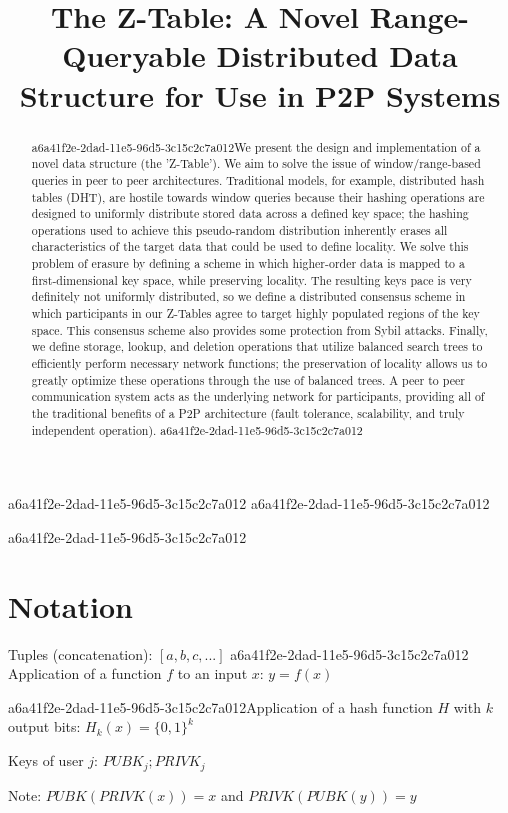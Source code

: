 \documentclass[12pt]{article}
\title{The Z-Table: A Novel Range-Queryable Distributed Data Structure for Use in P2P Systems}
\begin{document}
\maketitle
a6a41f2e-2dad-11e5-96d5-3c15c2c7a012
a6a41f2e-2dad-11e5-96d5-3c15c2c7a012\begin{abstract}
a6a41f2e-2dad-11e5-96d5-3c15c2c7a012We present the design and implementation of a novel data structure (the 'Z-Table'). We aim to solve the issue of window/range-based queries in peer to peer architectures. Traditional models, for example,  distributed hash tables (DHT), are hostile towards window queries because their hashing operations are designed to uniformly distribute stored data across a defined key space; the hashing operations used to achieve this pseudo-random distribution inherently erases all characteristics of the target data that could be used to define locality. We solve this problem of erasure by defining a scheme in which higher-order data is mapped to a first-dimensional key space, while preserving locality. The resulting keys pace is very definitely not uniformly distributed, so we define a distributed consensus scheme in which participants in our Z-Tables agree to target highly populated regions of the key space. This consensus scheme also provides some protection from Sybil attacks. Finally, we define storage, lookup, and deletion operations that utilize balanced search trees to efficiently perform necessary network functions; the preservation of locality allows us to greatly optimize these operations through the use of balanced trees. A peer to peer communication system acts as the underlying network for participants, providing all of the traditional benefits of a P2P architecture (fault tolerance, scalability, and truly independent operation).
a6a41f2e-2dad-11e5-96d5-3c15c2c7a012\end{abstract}

a6a41f2e-2dad-11e5-96d5-3c15c2c7a012\section{Notation}

Tuples (concatenation): $[a,b,c,...]$
a6a41f2e-2dad-11e5-96d5-3c15c2c7a012
Application of a function $f$ to an input $x$: $y=f(x)$

a6a41f2e-2dad-11e5-96d5-3c15c2c7a012Application of a hash function $H$ with $k$ output bits: $H_{k}(x) = \{0,1\}^k$

Keys of user $j$: $ PUBK_j; PRIVK_j $

Note: $PUBK(PRIVK(x)) = x$ and $PRIVK(PUBK(y)) = y$~
\end{document}
